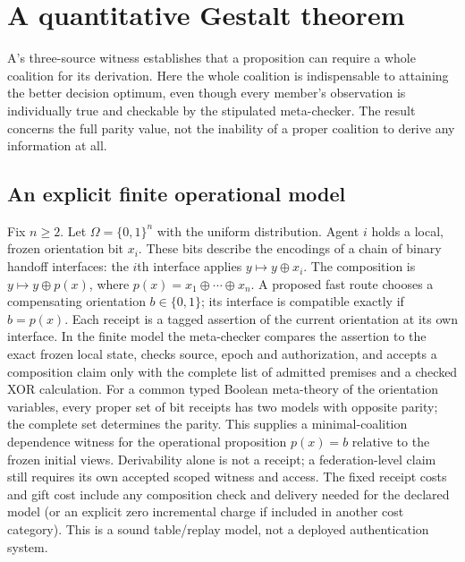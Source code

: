 \documentclass[11pt,letterpaper]{article}
\begin{document}
\section{A quantitative Gestalt theorem}
A's three-source witness establishes that a proposition can require a whole coalition for its derivation. Here the whole coalition is indispensable to attaining the better decision optimum, even though every member's observation is individually true and checkable by the stipulated meta-checker. The result concerns the full parity value, not the inability of a proper coalition to derive any information at all.

\subsection{An explicit finite operational model}
Fix $n\ge2$. Let $\Omega=\{0,1\}^n$ with the uniform distribution. Agent $i$ holds a local, frozen orientation bit $x_i$. These bits describe the encodings of a chain of binary handoff interfaces: the $i$th interface applies $y\mapsto y\oplus x_i$. The composition is $y\mapsto y\oplus p(x)$, where $p(x)=x_1\oplus\cdots\oplus x_n$. A proposed fast route chooses a compensating orientation $b\in\{0,1\}$; its interface is compatible exactly if $b=p(x)$. Each receipt is a tagged assertion of the current orientation at its own interface. In the finite model the meta-checker compares the assertion to the exact frozen local state, checks source, epoch and authorization, and accepts a composition claim only with the complete list of admitted premises and a checked XOR calculation. For a common typed Boolean meta-theory of the orientation variables, every proper set of bit receipts has two models with opposite parity; the complete set determines the parity. This supplies a minimal-coalition dependence witness for the operational proposition $p(x)=b$ relative to the frozen initial views. Derivability alone is not a receipt; a federation-level claim still requires its own accepted scoped witness and access. The fixed receipt costs and gift cost include any composition check and delivery needed for the declared model (or an explicit zero incremental charge if included in another cost category). This is a sound table/replay model, not a deployed authentication system.
\end{document}
